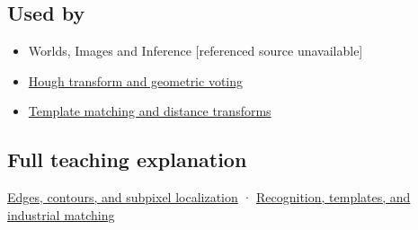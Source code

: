 \subsection{Used by}\label{appendix-36022286b03e-used-by}

\begin{itemize}
\tightlist
\item
  {Worlds, Images and Inference {[}referenced source unavailable{]}}
\item
  \hyperref[appendix-a5b0383b3b3e]{Hough transform and geometric voting}
\item
  \hyperref[appendix-5fb4af80d1c7]{Template matching and distance transforms}
\end{itemize}

\subsection{Full teaching explanation}\label{appendix-36022286b03e-full-teaching-explanation}

\hyperref[04-visual-computing-ii-ch030-edges-contours-and-subpixel-localization]{Edges, contours, and subpixel localization} · \hyperref[04-visual-computing-ii-ch030-recognition-templates-and-industrial-matching]{Recognition, templates, and industrial matching}
